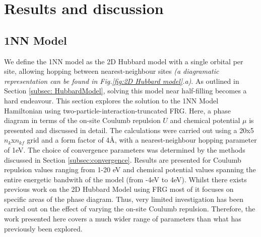 \documentclass[12pt]{article}
\begin{document}
\section{Results and discussion}

\subsection{1NN Model}
\label{subsec:1NNModel}

We define the 1NN model as the 2D Hubbard model with a single orbital per site,  allowing hopping between nearest-neighbour sites \textit{(a diagramatic representation can be found in Fig.\ref{fig:2D Hubbard model}.a)}. 
As outlined in Section \ref{subsec: HubbardModel}, solving this model near half-filling becomes a hard endeavour. 
This section explores the solution to the 1NN Model Hamiltonian using  two-particle-interaction-truncated FRG.
Here, a phase diagram in terms of the on-site Coulumb repulsion $U$ and chemical
potential $\mu$ is presented and discussed in detail. The calculations were carried out using a 20x5 $n_k$x$n_{kf}$ grid and a form factor
of 4\AA, with a  nearest-neighbour hopping parameter of 1eV.  The choice of convergence parameters was determined by the methods discussed in Section \ref{subsec:convergence}. 
Results are presented for Coulumb repulsion values  ranging from 1-20 eV and chemical potential
values spanning the entire energetic bandwith of the model (from -4eV to 4eV). 
Whilst there exists previous work on the 2D Hubbard Model using FRG\cite{beyer2023rashba,hille2020quantitative,vilardi2020dynamical} 
most of it focuses on specific areas of the phase diagram. Thus,
very limited investigation has been carried out on the effect of varying the 
on-site Coulumb repulsion. Therefore, the work presented here covers a much wider range of parameters than what has previously been explored. 
\medskip
\end{document}
